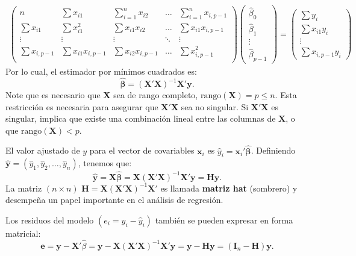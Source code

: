 \documentclass[
]{article}
\begin{document}
\begin{gather}
\begin{pmatrix}
n & \sum x_{i1} & \sum_{i=1}^{n}x_{i2} & \ldots & \sum_{i=1}^{n}x_{i,p-1} \\
\sum x_{i1} & \sum x_{i1}^2 & \sum x_{i1}x_{i2} & \ldots & \sum x_{i1}x_{i,p-1} \\
\vdots & \vdots & \vdots & \ddots & \vdots \\
\sum x_{i,p-1} & \sum x_{i1}x_{i,p-1} & \sum x_{i2}x_{i,p-1} & \ldots & \sum x_{i,p-1}^{2} \\
\end{pmatrix} \begin{pmatrix}
\widehat{\beta}_{0} \\ \widehat{\beta}_{1} \\ \vdots \\ \widehat{\beta}_{p-1} \end{pmatrix} = \begin{pmatrix}
\sum y_{i} \\ \sum x_{i1}y_{i} \\ \vdots \\ \sum x_{i,p-1}y_{i}
\end{pmatrix}
\nonumber
\end{gather}
Por lo cual, el estimador por mínimos cuadrados es:
\[
\widehat{\boldsymbol \beta}= (\boldsymbol X'\boldsymbol X)^{-1}\boldsymbol X'\boldsymbol y.
\]
Note que es necesario que \(\boldsymbol X\) sea de rango completo, \(\mbox{rango}(\boldsymbol X) = p \leq n\). Esta restricción es necesaria para asegurar que \(\boldsymbol X'\boldsymbol X\) sea no singular. Si \(\boldsymbol X'\boldsymbol X\) es singular, implica que existe una combinación lineal entre las columnas de \(\boldsymbol X\), o que \(\mbox{rango}(\boldsymbol X) < p\).

El valor ajustado de \(y\) para el vector de covariables \(\boldsymbol x_{i}\) es \(\widehat{y}_{i}= \boldsymbol x_{i}'\widehat{\boldsymbol \beta}\). Definiendo \(\widehat{\boldsymbol y}= (\widehat{y}_{1},\widehat{y}_{2},\ldots,\widehat{y}_{n})\), tenemos que:
\[
\widehat{\boldsymbol y}= \boldsymbol X\widehat{\boldsymbol \beta}= \boldsymbol X(\boldsymbol X'\boldsymbol X)^{-1}\boldsymbol X'\boldsymbol y= \boldsymbol H\boldsymbol y.
\]
La matriz \((n\times n)\) \(\boldsymbol H= \boldsymbol X(\boldsymbol X'\boldsymbol X)^{-1}\boldsymbol X'\) es llamada \textbf{matriz hat} (sombrero) y desempeña un papel importante en el análisis de regresión.

Los residuos del modelo \((e_{i}=y_{i}-\widehat{y}_{i})\) también se pueden expresar en forma matricial:
\[
\boldsymbol e= \boldsymbol y- \boldsymbol X'\widehat{\beta}= \boldsymbol y- \boldsymbol X(\boldsymbol X'\boldsymbol X)^{-1}\boldsymbol X'\boldsymbol y= \boldsymbol y- \boldsymbol H\boldsymbol y= (\boldsymbol I_{n} - \boldsymbol H)\boldsymbol y.
\]
\end{document}
